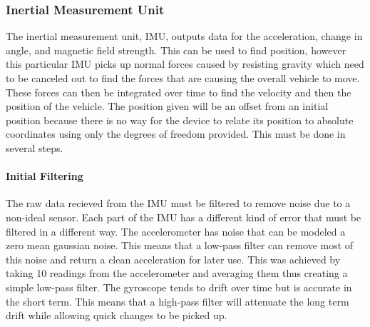 \documentclass{report}
\begin{document}
\subsubsection{Inertial Measurement Unit}
The inertial measurement unit, IMU, outputs data for the acceleration, change in angle, and magnetic field strength. This can be used to find position, however this particular IMU picks up normal forces caused by resisting gravity which need to be  canceled out to find the forces that are causing the overall vehicle to move. These forces can then be integrated over time to find the velocity and then the position of the vehicle. The position given will be an offset from an initial position because there is no way for the device to relate its position to absolute coordinates using only the degrees of freedom provided. This must be done in several steps.
\paragraph{Initial Filtering} The raw data recieved from the IMU must be filtered to remove noise due to a non-ideal sensor. Each part of the IMU has a different kind of error that must be filtered in a different way. The accelerometer has noise that can be modeled a zero mean gaussian noise. This means that a low-pass filter can remove most of this noise and return a clean acceleration for later use. This was achieved by taking 10 readings from the accelerometer and averaging them thus creating a simple low-pass filter. The gyroscope tends to drift over time but is accurate in the short term. This means that a high-pass filter will attenuate the long term drift while allowing quick changes to be picked up.
\end{document}
